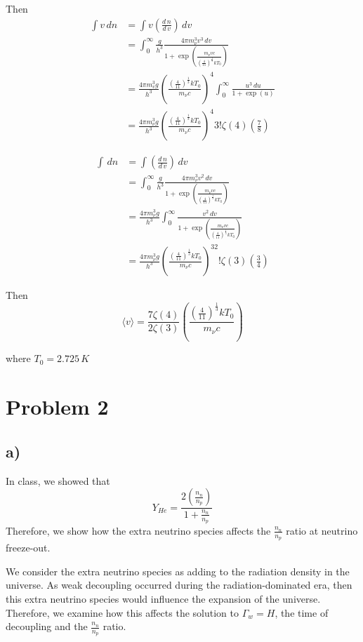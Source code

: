 \documentclass{article}
\newcommand{\tot}[2]{\frac{d\,#1}{d\,#2}}
\begin{document}
Then
\begin{align*}
\int v\,dn &= \int v\left(\tot{n}{v}\right)\,dv\\
&= \int_0^\infty \frac{g}{h^3}\frac{4\pi m_\nu^3 v^3\,dv}{1+\exp\left(\frac{m_\nu v c}{\left(\frac{4}{11}\right)^{\frac{1}{3}}k T_0}\right)}\\
&= \frac{4\pi m_v^3 g}{h^3}\left(\frac{\left(\frac{4}{11}\right)^{\frac{1}{3}}k T_0}{m_\nu c}\right)^4 \int_0^\infty \frac{u^3\,du}{1+\exp(u)}\\
&= \frac{4\pi m_\nu^3 g}{h^3}\left(\frac{\left(\frac{4}{11}\right)^{\frac{1}{3}} kT_0}{m_\nu c}\right)^4 3!\zeta(4)\left(\frac{7}{8}\right)
\end{align*}

\begin{align*}
\int\,dn &= \int \left(\tot{n}{v}\right)\,dv\\
&= \int_0^\infty \frac{g}{h^3}\frac{4\pi m_\nu^3 v^2\,dv}{1+\exp\left(\frac{m_\nu v c}{\left(\frac{4}{11}\right)^{\frac{1}{3}}kT_0}\right)}\\
&= \frac{4\pi m_\nu^3 g}{h^3}\int_0^\infty \frac{v^2\,dv}{1+\exp\left(\frac{m_\nu v c}{\left(\frac{4}{11}\right)^{\frac{1}{3}}kT_0}\right)}\\
&= \frac{4\pi m_\nu^3 g}{h^3}\left(\frac{\left(\frac{4}{11}\right)^{\frac{1}{3}} kT_0}{m_\nu c}\right)^32!\zeta(3)\left(\frac{3}{4}\right)
\end{align*}

Then
\[\langle v\rangle = \frac{7\zeta(4)}{2\zeta(3)}\left(\frac{\left(\frac{4}{11}\right)^{\frac{1}{3}}k T_0}{m_\nu c}\right)\]

where $T_0 = 2.725\,K$

\section*{Problem 2}
\subsection*{a)}
In class, we showed that
\[Y_{He} = \frac{2\left(\frac{n_n}{n_p}\right)}{1+\frac{n_n}{n_p}}\]
Therefore, we show how the extra neutrino species affects the $\frac{n_n}{n_p}$ ratio at neutrino freeze-out. 

We consider the extra neutrino species as adding to the radiation density in the universe. As weak decoupling occurred during the radiation-dominated era, then this extra neutrino species would influence the expansion of the universe. Therefore, we examine how this affects the solution to $\Gamma_w = H$, the time of decoupling and the $\frac{n_n}{n_p}$ ratio.
\end{document}
